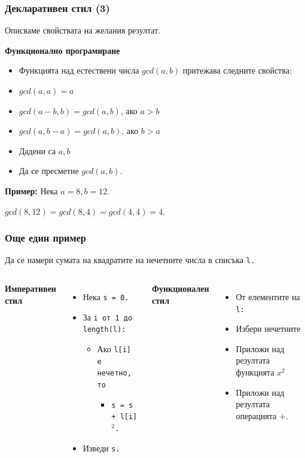 \documentclass{beamer}
\begin{document}
\begin{frame}
  \frametitle{Декларативен стил (3)}

  Описваме свойствата на желания резултат.
  \vspace{1em}

  \textbf{Функционално програмиране}

  \begin{itemize}
  \item Функцията над естествени числа $gcd(a,b)$ притежава следните свойства:
  \item $gcd(a,a) = a$
  \item $gcd(a-b,b) = gcd(a,b)$, ако $a > b$
  \item $gcd(a,b-a) = gcd(a,b)$, ако $b > a$
  \item Дадени са $a, b$
  \item Да се пресметне $gcd(a,b)$.
  \end{itemize}

  \pause

  \textbf{Пример:}
  Нека $a = 8, b = 12$.

  $gcd(8,12) = gcd(8,4) = gcd(4,4) = 4$.
\end{frame}

\begin{frame}
  \frametitle{Още един пример}

  Да се намери сумата на квадратите на нечетните числа в списъка \tt l.

  \begin{columns}[t,onlytextwidth]
    
    \textbf{Императивен стил}
    \begin{itemize}
    \item Нека \tt{s = 0}.
    \item За \tt i от 1 до \tt{length(l)}:
      \begin{itemize}
      \item Ако \tt{l[i]} е нечетно, то
        \begin{itemize}
        \item \tt{s = s + l[i]$^2$}.
        \end{itemize}
      \end{itemize}
    \item Изведи \tt s.
    \end{itemize}


    \textbf{Функционален стил}
    
    \begin{itemize}
    \item От елементите на \tt l:
    \item Избери нечетните
    \item Приложи над резултата функцията $x^2$
    \item Приложи над резултата операцията $+$.
    \end{itemize}
  \end{columns}
\end{frame}
\end{document}
